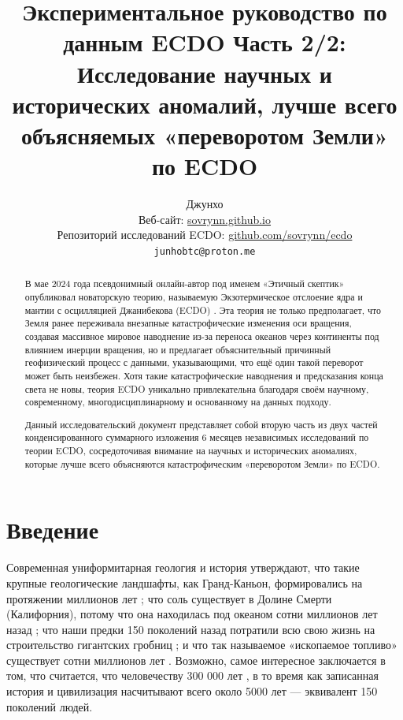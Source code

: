 \documentclass[10pt,twocolumn,letterpaper]{article}
\begin{document}
\title{Экспериментальное руководство по данным ECDO Часть 2/2: Исследование научных и исторических аномалий, лучше всего объясняемых «переворотом Земли» по ECDO}

\author{Джунхо\\
Веб-сайт: \href{https://sovrynn.github.io}{sovrynn.github.io}\\
Репозиторий исследований ECDO: \href{https://github.com/sovrynn/ecdo}{github.com/sovrynn/ecdo}\\
{\tt\small junhobtc@proton.me}
}

\maketitle

\begin{abstract}
В мае 2024 года псевдонимный онлайн-автор под именем «Этичный скептик» \cite{0} опубликовал новаторскую теорию, называемую Экзотермическое отслоение ядра и мантии с осцилляцией Джанибекова (ECDO) \cite{1}. Эта теория не только предполагает, что Земля ранее переживала внезапные катастрофические изменения оси вращения, создавая массивное мировое наводнение из-за переноса океанов через континенты под влиянием инерции вращения, но и предлагает объяснительный причинный геофизический процесс с данными, указывающими, что ещё один такой переворот может быть неизбежен. Хотя такие катастрофические наводнения и предсказания конца света не новы, теория ECDO уникально привлекательна благодаря своём научному, современному, многодисциплинарному и основанному на данных подходу.

Данный исследовательский документ представляет собой вторую часть из двух частей конденсированного суммарного изложения 6 месяцев независимых исследований \cite{2,20} по теории ECDO, сосредоточивая внимание на научных и исторических аномалиях, которые лучше всего объясняются катастрофическим «переворотом Земли» по ECDO.

\end{abstract}


\section{Введение}

Современная униформитарная геология и история утверждают, что такие крупные геологические ландшафты, как Гранд-Каньон, формировались на протяжении миллионов лет \cite{143}; что соль существует в Долине Смерти (Калифорния), потому что она находилась под океаном сотни миллионов лет назад \cite{144}; что наши предки 150 поколений назад потратили всю свою жизнь на строительство гигантских гробниц \cite{29,70}; и что так называемое «ископаемое топливо» существует сотни миллионов лет \cite{104}. Возможно, самое интересное заключается в том, что считается, что человечеству 300 000 лет \cite{145}, в то время как записанная история и цивилизация насчитывают всего около 5000 лет — эквивалент 150 поколений людей.
\end{document}
